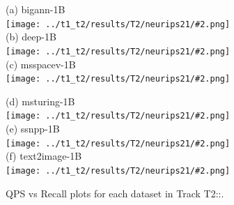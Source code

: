 \newcommand{\TtwoResPlot}[2]{
    \centering
    (#1) #2 \\
    \texttt{[image: ../t1\_t2/results/T2/neurips21/\#2.png]} \\
}


\begin{figure}[ht]
\begin{minipage}{0.5\linewidth}
  \TtwoResPlot{a}{bigann-1B}
  \TtwoResPlot{b}{deep-1B}
  \TtwoResPlot{c}{msspacev-1B}
  \end{minipage}%
\begin{minipage}{0.5\linewidth} 
  \TtwoResPlot{d}{msturing-1B}
  \TtwoResPlot{e}{ssnpp-1B}
  \TtwoResPlot{f}{text2image-1B}
\end{minipage}
  \caption{QPS vs Recall plots for each dataset in Track T2::.}

\end{figure}

\iffalse 

